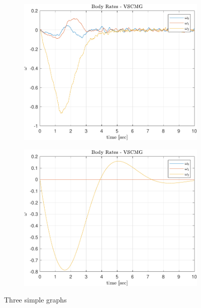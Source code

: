 \begin{figure}[ht]
     \centering
     \begin{subfigure}[b]{0.49\textwidth}
         \centering
         \includegraphics[width=\textwidth]{figures/plots/Results/vs-nn-w.pdf}
         \label{fig:y equals x}
     \end{subfigure}
     \begin{subfigure}[b]{0.49\textwidth}
         \centering
         \includegraphics[width=\textwidth]{figures/plots/Results/vs-vs-w.pdf}
         \label{fig:three sin x}
     \end{subfigure}
        \caption{Three simple graphs}
        \label{fig:three graphs}
\end{figure}

